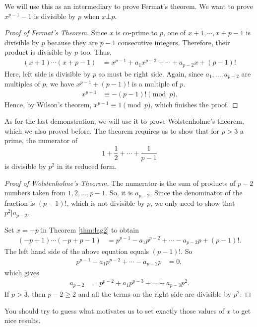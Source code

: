 \documentclass[12pt]{subfile}
\begin{document}
	We will use this as an intermediary to prove Fermat's theorem. We want to prove $x^{p-1}-1$ is divisible by $p$ when $x\bot p$.
		\begin{proof}[Proof of Fermat's Theorem]
			Since $x$ is co-prime to $p$, one of $x+1,\cdots,x+p-1$ is divisible by $p$ because they are $p-1$ consecutive integers. Therefore, their product is divisible by $p$ too. Thus,
				\begin{align*}
					(x+1)\cdots(x+p-1) & = x^{p-1}+a_1x^{p-2}+\cdots+a_{p-2}x+(p-1)!
				\end{align*}
			Here, left side is divisible by $p$ so must be right side. Again, since $a_1,\ldots,a_{p-2}$ are multiples of $p$, we have $x^{p-1}+(p-1)!$ is a multiple of $p$.
				\begin{align*}
					x^{p-1} & \equiv-(p-1)!\pmod p.
				\end{align*}
			Hence, by Wilson's theorem, $x^{p-1} \equiv 1 \pmod p$, which finishes the proof.
		\end{proof}
	As for the last demonstration, we will use it to prove Wolstenholme's theorem, which we also proved before. The theorem requires us to show that for $p>3$ a prime, the numerator of $$1+\dfrac{1}{2}+\cdots+\dfrac{1}{p-1}$$ is divisible by $p^2$ in its reduced form.
		\begin{proof}[Proof of Wolstenholme's Theorem]
			The numerator is the sum of products of $p-2$ numbers taken from $1, 2, \ldots, p-1$. So, it is $a_{p-2}$. Since the denominator of the fraction is $(p-1)!$, which is not divisible by $p$, we only need to show that $p^2|a_{p-2}$. 
			
			Set $x=-p$ in Theorem \ref{thm:lag2} to obtain
				\begin{align*}
					(-p+1)\cdots(-p+p-1) & = p^{p-1}-a_1p^{p-2}+\cdots-a_{p-2}p+(p-1)!.
				\end{align*}
			The left hand side of the above equation equals $(p-1)!$. So
				\begin{align*}
					p^{p-1}-a_1p^{p-2}+\cdots-a_{p-2}p & = 0,
				\end{align*}
			which gives
				\begin{align*}
					a_{p-2} & = p^{p-2}+a_1p^{p-3}+\cdots+a_{p-3}p^2.
				\end{align*}
			If $p>3$, then $p-2\geq 2$ and all the terms on the right side are divisible by $p^2$.
		\end{proof}
		
		\begin{note}
			You should try to guess what motivates us to set exactly those values of $x$ to get nice results.
		\end{note}
\end{document}
